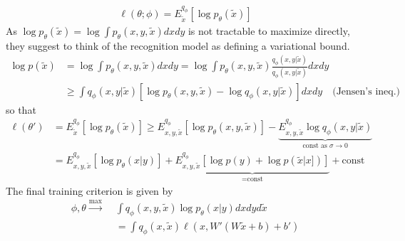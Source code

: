 \documentclass[12pt,a4paper]{article}
\begin{document}
\begin{enumerate}
\begin{align}
\ell(\theta; \phi) = E^{q_\phi} _{\tilde x}\left[ \log p_\theta(\tilde x)\right]
\end{align}
As $\log p_\theta(\tilde x) = \log \int p_\theta(x,y,\tilde x) dx dy$ is not tractable to maximize directly, they suggest to think of the recognition model as defining a variational bound. 
\begin{align}
\log p(\tilde x) &= \log \int p_\theta(x,y,\tilde x) dx dy = \log \int p_\theta(x,y,\tilde x) \frac{q_\phi(x,y| \tilde x)}{q_\phi( x,y| \tilde x)} dx dy \\
& \ge \int q_\phi(x,y | \tilde x) \left[ \log p_\theta(x,y,\tilde x) - \log q_\phi(x,y | \tilde x) \right] dx dy \quad \text{(Jensen's ineq.)}
\end{align}
so that 
\begin{align}
\ell(\theta') & = E^{q_\phi}_{\tilde x}\left[ \log p_\theta(\tilde x)\right] \ge E^{q_\phi}_{x,y,\tilde x}[ \log p_\theta(x,y,\tilde x)] -  \underbrace{E^{q_\phi}_{x,y,\tilde x} \log q_\phi(x,y|\tilde x)}_{\text{const as $\sigma \to 0$}} \\
& = E^{q_\phi}_{x,y,\tilde x}[ \log p_\theta(x|y) ] + \underbrace{E^{q_\phi}_{x,y,\tilde x}[ \log p(y) + \log p(\tilde x|x])]}_{=\text{const}}  + \text{const}
\end{align}
The final training criterion is given by 
\begin{align}
\phi, \theta \stackrel{\max}{\longrightarrow} \; & \int q_\phi(x,y,\tilde x) \log p_\theta(x|y) dx dy d\tilde x \\
& = \int q_\phi(x,\tilde x) \ell(x, W' ( W \tilde x + b) + b')
\end{align}


\end{enumerate}





\end{document}
